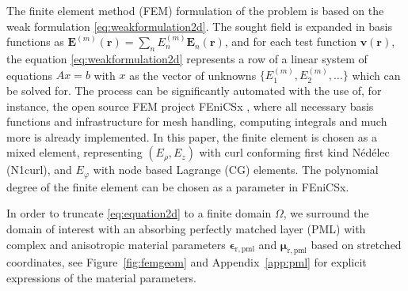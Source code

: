 \documentclass[a4paper,12pt]{article}
\renewcommand{\vec}[1]{\boldsymbol{#1}}
\newcommand{\mrm}[1]{\mathrm{#1}}
\newcommand{\Ev}{\vec{E}}
\newcommand{\rv}{\vec{r}}
\newcommand{\vv}{\vec{v}}
\newcommand{\epsm}{\boldsymbol{\epsilon}}
\newcommand{\mum}{\boldsymbol{\mu}}
\begin{document}
The finite element method (FEM) formulation of the problem is based on
the weak formulation \eqref{eq:weakformulation2d}. The sought field is
expanded in basis functions as
$\Ev^{(m)}(\rv) = \sum_{n}E_{n}^{(m)}\Ev_{n}(\rv)$, and for each test
function $\vv(\rv)$, the equation \eqref{eq:weakformulation2d}
represents a row of a linear system of equations $Ax=b$ with $x$ as
the vector of unknowns $\{E_{1}^{(m)},E_{2}^{(m)},\ldots\}$ which can
be solved for. The process can be significantly automated with the use
of, for instance, the open source FEM project FEniCSx
\cite{Baratta+etal2023,Scroggs+etal2022a,Scroggs+etal2022b,Alnaes+etal2014},
where all necessary basis functions and infrastructure for mesh
handling, computing integrals and much more is already implemented. In
this paper, the finite element is chosen as a mixed element,
representing $(E_{\rho},E_{z})$ with curl conforming first kind
Nédélec (N1curl), and $E_{\varphi}$ with node based Lagrange (CG)
elements. The polynomial degree of the finite element can be chosen as
a parameter in FEniCSx.

In order to truncate \eqref{eq:equation2d} to a finite domain
$\Omega$, we surround the domain of interest with an absorbing
perfectly matched layer (PML) with complex and anisotropic material
parameters $\epsm_{\mrm{r,pml}}$ and $\mum_{\mrm{r,pml}}$ based on
stretched coordinates, see Figure~\ref{fig:femgeom} and
Appendix~\ref{app:pml} for explicit expressions of the material
parameters.
\end{document}
